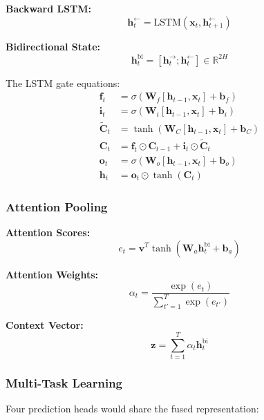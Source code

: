 \documentclass[conference]{IEEEtran}
\begin{document}
\textbf{Backward LSTM:}
\begin{equation}
\mathbf{h}_t^{\leftarrow} = \text{LSTM}(\mathbf{x}_t, \mathbf{h}_{t+1}^{\leftarrow})
\end{equation}

\textbf{Bidirectional State:}
\begin{equation}
\mathbf{h}_t^{\text{bi}} = [\mathbf{h}_t^{\rightarrow}; \mathbf{h}_t^{\leftarrow}] \in \mathbb{R}^{2H}
\end{equation}

The LSTM gate equations:
\begin{equation}
\begin{aligned}
\mathbf{f}_t &= \sigma(\mathbf{W}_f[\mathbf{h}_{t-1}, \mathbf{x}_t] + \mathbf{b}_f) \\
\mathbf{i}_t &= \sigma(\mathbf{W}_i[\mathbf{h}_{t-1}, \mathbf{x}_t] + \mathbf{b}_i) \\
\tilde{\mathbf{C}}_t &= \tanh(\mathbf{W}_C[\mathbf{h}_{t-1}, \mathbf{x}_t] + \mathbf{b}_C) \\
\mathbf{C}_t &= \mathbf{f}_t \odot \mathbf{C}_{t-1} + \mathbf{i}_t \odot \tilde{\mathbf{C}}_t \\
\mathbf{o}_t &= \sigma(\mathbf{W}_o[\mathbf{h}_{t-1}, \mathbf{x}_t] + \mathbf{b}_o) \\
\mathbf{h}_t &= \mathbf{o}_t \odot \tanh(\mathbf{C}_t)
\end{aligned}
\end{equation}

\subsubsection{Attention Pooling}
\textbf{Attention Scores:}
\begin{equation}
e_t = \mathbf{v}^T\tanh(\mathbf{W}_a\mathbf{h}_t^{\text{bi}} + \mathbf{b}_a)
\end{equation}

\textbf{Attention Weights:}
\begin{equation}
\alpha_t = \frac{\exp(e_t)}{\sum_{t'=1}^{T}\exp(e_{t'})}
\end{equation}

\textbf{Context Vector:}
\begin{equation}
\mathbf{z} = \sum_{t=1}^{T}\alpha_t\mathbf{h}_t^{\text{bi}}
\end{equation}

\subsubsection{Multi-Task Learning}
Four prediction heads would share the fused representation:
\end{document}
